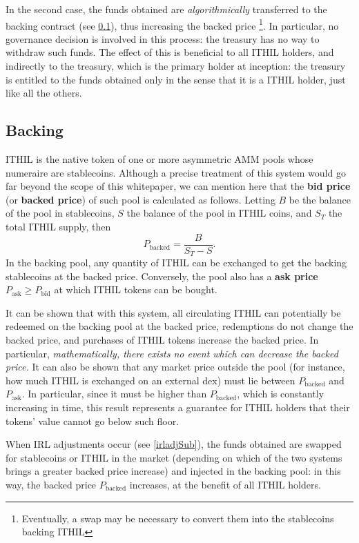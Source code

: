 \documentclass[a4paper,10 pt]{article}
\theoremstyle{definition}
\begin{document}
In the second case, the funds obtained are {\it algorithmically} transferred to the backing contract (see \ref{bpaSub}), thus increasing the backed price \footnote{Eventually, a swap may be necessary to convert them into the stablecoins backing ITHIL}. In particular, no governance decision is involved in this process: the treasury has no way to withdraw such funds. The effect of this is beneficial to all ITHIL holders, and indirectly to the treasury, which is the primary holder at inception: the treasury is entitled to the funds obtained only in the sense that it is a ITHIL holder, just like all the others.

\subsection{Backing}\label{bpaSub}

ITHIL is the native token of one or more asymmetric AMM pools whose numeraire are stablecoins. Although a precise treatment of this system would go far beyond the scope of this whitepaper, we can mention here that the {\bf bid price} (or {\bf backed price}) of such pool is calculated as follows. Letting $B$ be the balance of the pool in stablecoins, $S$ the balance of the pool in ITHIL coins, and $S_T$ the total ITHIL supply, then
\begin{equation}\label{backedprice}
P_\text{backed} = \frac{B}{S_T-S}.
\end{equation}
In the backing pool, any quantity of ITHIL can be exchanged to get the backing stablecoins at the backed price. Conversely, the pool also has a {\bf ask price} $P_{\text{ask}} \ge P_{\text{bid}}$ at which ITHIL tokens can be bought.

It can be shown that with this system, all circulating ITHIL can potentially be redeemed on the backing pool at the backed price, redemptions do not change the backed price, and purchases of ITHIL tokens increase the backed price. In particular, {\it mathematically, there exists no event which can decrease the backed price.} It can also be shown that any market price outside the pool (for instance, how much ITHIL is exchanged on an external dex) must lie between $P_\text{backed}$ and $P_\text{ask}$. In particular, since it must be higher than $P_{\text{backed}}$, which is constantly increasing in time, this result represents a guarantee for ITHIL holders that their tokens' value cannot go below such floor.

When IRL adjustments occur (see \ref{irladjSub}), the funds obtained are swapped for stablecoins or ITHIL in the market (depending on which of the two systems brings a greater backed price increase) and injected in the backing pool: in this way, the backed price $P_{\text{backed}}$ increases, at the benefit of all ITHIL holders.
\end{document}
